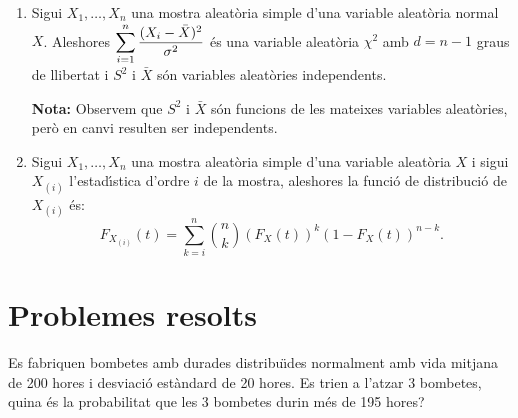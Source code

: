 \begin{enumerate}
\item Sigui $X_1, \ldots , X_n$ una mostra aleat\`oria simple d'una variable
aleat\`oria normal~$X$. 
Aleshores $\displaystyle \sum_{i=1}^n{(X_i-\bar{X})^2
\over \sigma^2}$ \'es una variable aleat\`oria $\chi^2$ amb $d=n-1$ graus de
llibertat i $S^2$ i $\bar{X}$ s\'on variables aleat\`ories independents.

{\bf Nota:} Observem que $S^2$ i $\bar{X}$ s\'on funcions de les mateixes
variables aleat\`ories, per\`o en canvi resulten ser independents.

\item Sigui $X_1, \ldots , X_n$ una mostra aleat\`oria simple d'una variable
aleat\`oria $X$ i sigui $X_{(i)}$ l'estad\'{\i}stica d'ordre $i$ de la mostra,
aleshores la funci\'o de distribuci\'o
 de $X_{(i)}$ \'es:
$$F_{X_{(i)}}(t) = \sum_{k=i}^n {n \choose k} (F_X(t))^k (1-F_X(t))^{n-k}.$$
\end{enumerate}

\section{Problemes resolts}

\begin{probres}
{Es fabriquen bombetes amb durades 
distribu\"{\i}des normalment amb vida mitjana de 200 hores 
i desviaci\'o est\`andard 
de 20 hores. Es trien a l'atzar 3 bombetes, 
quina \'es la probabilitat que les 3 bombetes durin
m\'es de 195 hores?}
\end{probres}


